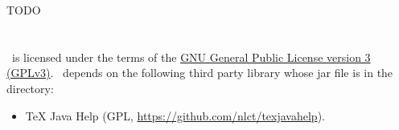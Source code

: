 TODO

\chapter{}
\label{sec:licence}

%
\FlowframTk\ is licensed under the terms of the 
\href{https://www.gnu.org/licenses/gpl-3.0.html}{GNU General
Public License version 3 (GPLv3)}.
\FlowframTk\ depends on the following third party library whose
jar file is in the  directory:
\begin{itemize}
   \item TeX Java Help 
   (GPL, \url{https://github.com/nlct/texjavahelp}).
\end{itemize}



\printmain
\printindex 

 

